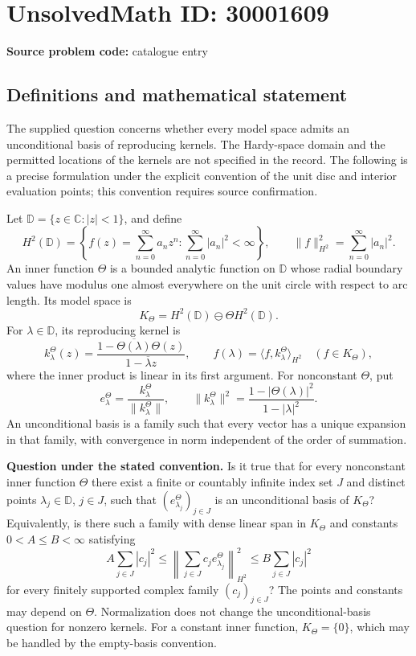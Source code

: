 \documentclass[11pt]{article}
\newcommand{\C}{\mathbb{C}}
\begin{document}
\section*{UnsolvedMath ID: 30001609}
\textbf{Source problem code:} catalogue entry
\subsection{Definitions and mathematical statement}
The supplied question concerns whether every model space admits an unconditional basis of reproducing kernels. The Hardy-space domain and the permitted locations of the kernels are not specified in the record. The following is a precise formulation under the explicit convention of the unit disc and interior evaluation points; this convention requires source confirmation.

Let \(\mathbb D=\{z\in\C:|z|<1\}\), and define
\[
H^2(\mathbb D)=\left\{f(z)=\sum_{n=0}^{\infty}a_nz^n:\sum_{n=0}^{\infty}|a_n|^2<\infty\right\},
\qquad \|f\|_{H^2}^2=\sum_{n=0}^{\infty}|a_n|^2.
\]
An inner function \(\Theta\) is a bounded analytic function on \(\mathbb D\) whose radial boundary values have modulus one almost everywhere on the unit circle with respect to arc length. Its model space is
\[
K_\Theta=H^2(\mathbb D)\ominus\Theta H^2(\mathbb D).
\]
For \(\lambda\in\mathbb D\), its reproducing kernel is
\[
k_\lambda^\Theta(z)=\frac{1-\overline{\Theta(\lambda)}\Theta(z)}{1-\overline\lambda z},
\qquad f(\lambda)=\langle f,k_\lambda^\Theta\rangle_{H^2}\quad(f\in K_\Theta),
\]
where the inner product is linear in its first argument. For nonconstant \(\Theta\), put
\[
e_\lambda^\Theta=\frac{k_\lambda^\Theta}{\|k_\lambda^\Theta\|},
\qquad \|k_\lambda^\Theta\|^2=\frac{1-|\Theta(\lambda)|^2}{1-|\lambda|^2}.
\]
An unconditional basis is a family such that every vector has a unique expansion in that family, with convergence in norm independent of the order of summation.

\textbf{Question under the stated convention.} Is it true that for every nonconstant inner function \(\Theta\) there exist a finite or countably infinite index set \(J\) and distinct points \(\lambda_j\in\mathbb D\), \(j\in J\), such that \((e_{\lambda_j}^\Theta)_{j\in J}\) is an unconditional basis of \(K_\Theta\)? Equivalently, is there such a family with dense linear span in \(K_\Theta\) and constants \(0<A\leq B<\infty\) satisfying
\[
A\sum_{j\in J}|c_j|^2
\leq \left\|\sum_{j\in J}c_j e_{\lambda_j}^\Theta\right\|_{H^2}^2
\leq B\sum_{j\in J}|c_j|^2
\]
for every finitely supported complex family \((c_j)_{j\in J}\)? The points and constants may depend on \(\Theta\). Normalization does not change the unconditional-basis question for nonzero kernels. For a constant inner function, \(K_\Theta=\{0\}\), which may be handled by the empty-basis convention.
\end{document}
